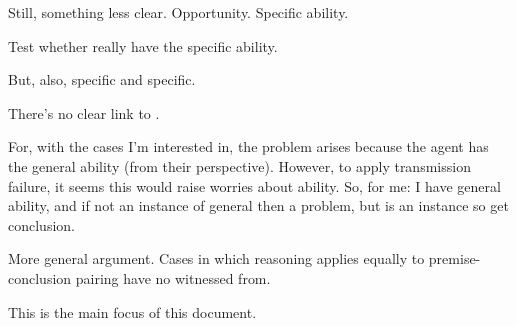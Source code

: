 \begin{note}
  Still, something less clear.
  Opportunity.
  Specific ability.

  Test whether really have the specific ability.

  But, also, specific and specific.
\end{note}

\begin{note}
  \color{red}
  There's no clear link to \citeauthor{Wright:2011wn}.

  For, with the cases I'm interested in, the problem arises because the agent has the general ability (from their perspective).
  However, to apply transmission failure, it seems this would raise worries about ability.
  So, for me:
  I have general ability, and if not an instance of general then a problem, but is an instance so get conclusion.
\end{note}

\begin{note}
  More general argument.
  Cases in which reasoning applies equally to premise-conclusion pairing have no witnessed from.

  This is the main focus of this document.
\end{note}

